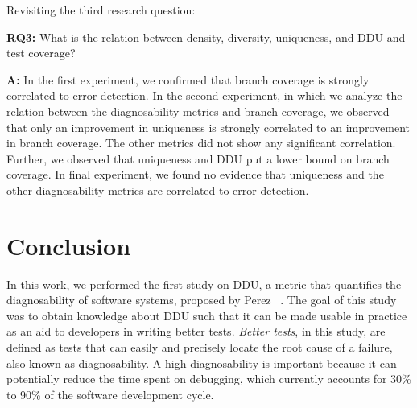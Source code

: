 \documentclass[twoside,a4paper,11pt]{memoir}
\begin{document}
Revisiting the third research question:
\begin{framed}
\noindent
\textbf{RQ3:} What is the relation between density, diversity, uniqueness, and DDU and test coverage?
\end{framed}
\textbf{A:} In the first experiment, we confirmed that branch coverage is strongly correlated to error detection.
In the second experiment, in which we analyze the relation between the diagnosability metrics and branch coverage, we observed that only an improvement in uniqueness is strongly correlated to an improvement in branch coverage.
The other metrics did not show any significant correlation.
Further, we observed that uniqueness and DDU put a lower bound on branch coverage.
In final experiment, we found no evidence that uniqueness and the other diagnosability metrics are correlated to error detection.

\chapter{Conclusion}%
\label{ch:conclusion}


In this work, we performed the first study on DDU, a metric that quantifies the diagnosability of software systems, proposed by Perez \etal~\cite{DBLP:conf/icse/PerezAD17}.
The goal of this study was to obtain knowledge about DDU such that it can be made usable in practice as an aid to developers in writing better tests.
\emph{Better tests}, in this study, are defined as tests that can easily and precisely locate the root cause of a failure, also known as diagnosability.
A high diagnosability is important because it can potentially reduce the time spent on debugging, which currently accounts for 30\% to 90\% of the software development cycle.


\end{document}
